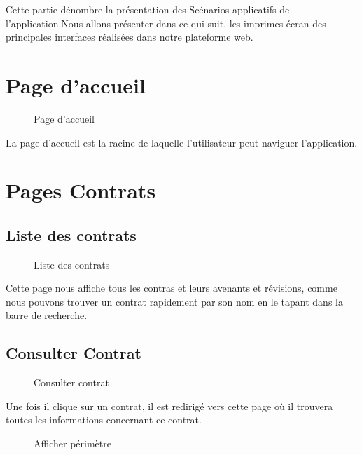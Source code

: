 Cette partie dénombre la présentation des Scénarios applicatifs de l’application.Nous allons présenter dans  ce  qui  suit,  les  imprimes écran des principales interfaces réalisées dans notre plateforme web.

\section{Page d'accueil}
\begin{figure}[H]
    \begin{center}
        \caption{Page d'accueil}
    \end{center}
\end{figure}
La page d'accueil est la racine de laquelle l'utilisateur peut naviguer l'application.
\section{Pages Contrats}
\subsection{Liste des contrats}
\begin{figure}[H]
    \begin{center}
        \caption{Liste des contrats}
    \end{center}
\end{figure}
Cette page nous affiche tous les contras et leurs avenants et révisions, comme nous pouvons trouver un contrat rapidement par son nom en le tapant dans la barre de recherche.
\subsection{Consulter Contrat}
\begin{figure}[H]
    \begin{center}
        \caption{Consulter contrat}
    \end{center}
\end{figure}
Une fois il clique sur un contrat, il est redirigé vers cette page où il trouvera toutes les informations concernant ce contrat.
\begin{figure}[H]
    \begin{center}
        \caption{Afficher périmètre}
    \end{center}
\end{figure}
